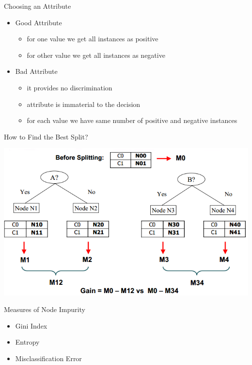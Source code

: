 \documentclass{beamer}
\begin{document}
\begin{frame}{Choosing an Attribute}
    \begin{itemize}
        \item Good Attribute \pause
        \begin{itemize}
            \item for one value we get all instances as positive
            \item for other value we get all instances as negative
        \end{itemize}
        \item Bad Attribute \pause
        \begin{itemize}
            \item it provides no discrimination
            \item attribute is immaterial to the decision
            \item for each value we have same number of positive and negative instances
        \end{itemize}
    \end{itemize}
\end{frame}


\begin{frame}{How to Find the Best Split?}
    \begin{center}
        \includegraphics[scale=0.4]{howToFindBestSplit.png}
    \end{center}
\end{frame}


\begin{frame}{Measures of Node Impurity}
    \begin{itemize}
        \item Gini Index
        \item Entropy
        \item Misclassification Error
    \end{itemize}
\end{frame}
\end{document}
